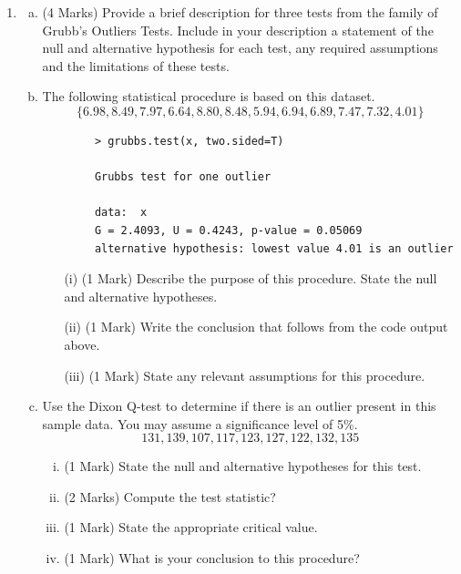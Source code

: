 \documentclass[a4paper,12pt]{article}
\begin{document}
\begin{enumerate}
\item 
\begin{enumerate}[(a)]
\item (4 Marks) Provide a brief description for three tests from the family of Grubb's Outliers Tests. Include in your description a statement of the null and alternative hypothesis for each test, any required assumptions and the limitations of these tests.			
\medskip
\item The following statistical procedure is based on this dataset.
\[\{6.98, 8.49, 7.97, 6.64,
			8.80, 8.48, 5.94, 6.94,
			6.89, 7.47, 7.32, 4.01\}	\]
	
	\begin{framed}
		
		\begin{verbatim}
		> grubbs.test(x, two.sided=T)
		
		Grubbs test for one outlier
		
		data:  x
		G = 2.4093, U = 0.4243, p-value = 0.05069
		alternative hypothesis: lowest value 4.01 is an outlier
		\end{verbatim}
	\end{framed}
	
	\begin{itemize}
		\item[(i)] (1 Mark) Describe the purpose of this procedure. State the null and alternative hypotheses. 
		\item[(ii)] (1 Mark) Write the conclusion that follows from the code output above.
		\item[(iii)] (1 Mark) State any relevant assumptions for this procedure.
	\end{itemize}
\medskip
\item Use the Dixon Q-test to determine if there is an outlier present in this sample data. You may assume
a significance level of 5\%.
\[ 131, 139, 107, 117, 123, 127, 122, 132, 135\]
\begin{enumerate}[(i)]
\item (1 Mark) State the null and alternative hypotheses for this test.
\item (2 Marks) Compute the test statistic?
\item (1 Mark) State the appropriate critical value.
\item (1 Mark) What is your conclusion to this procedure?
\end{enumerate}

	\smallskip


\end{enumerate}
\end{enumerate}
\end{document}
